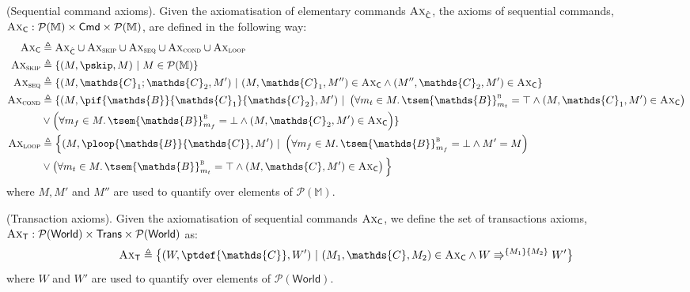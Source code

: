 \begin{defn}
	(Sequential command axioms).
	Given the axiomatisation of elementary commands $\textsc{Ax}_{\hat{\mathsf{C}}}$, the axioms of sequential commands, $\textsc{Ax}_\mathsf{C} : \mathcal{P}(\mathbb{M}) \times \mathsf{Cmd} \times \mathcal{P}(\mathbb{M})$, are defined in the following way:
	\begin{align*}
		\textsc{Ax}_\mathsf{C} &\triangleq \textsc{Ax}_{\hat{\mathsf{C}}} \cup \textsc{Ax}_{\textsc{skip}} \cup \textsc{Ax}_{\textsc{seq}} \cup \textsc{Ax}_{\textsc{cond}} \cup \textsc{Ax}_{\textsc{loop}}
		\\
		\textsc{Ax}_{\textsc{skip}} &\triangleq \{ (M, \pskip, M)\ |\ M \in \mathcal{P}(\mathbb{M}) \}
		\\
		\textsc{Ax}_{\textsc{seq}} &\triangleq \{ (M, \mathds{C}_1 ; \mathds{C}_2, M')\ |\ (M, \mathds{C}_1, M'') \in \textsc{Ax}_\mathsf{C} \land (M'', \mathds{C}_2, M') \in \textsc{Ax}_\mathsf{C} \}
		\\
		\textsc{Ax}_{\textsc{cond}} &\triangleq \{ (M, \pif{\mathds{B}}{\mathds{C}_1}{\mathds{C}_2}, M')\ |\ \left( \forall m_t \in M \ldotp \tsem{\mathds{B}}^\textsc{b}_{m_t} = \top \land (M, \mathds{C}_1, M') \in \textsc{Ax}_\mathsf{C} \right) \\ &\lor \left( \forall m_f \in M \ldotp \tsem{\mathds{B}}^\textsc{b}_{m_f} = \bot \land (M, \mathds{C}_2, M') \in \textsc{Ax}_\mathsf{C} \right) \}
		\\
		\textsc{Ax}_{\textsc{loop}} &\triangleq \Big\{ (M, \ploop{\mathds{B}}{\mathds{C}}, M')\ |\ \left( \forall m_f \in M \ldotp \tsem{\mathds{B}}^\textsc{b}_{m_f} = \bot \land M' = M \right) \\ &\lor \left( \forall m_t \in M \ldotp \tsem{\mathds{B}}^\textsc{b}_{m_t} = \top \land  (M, \mathds{C}, M') \in \textsc{Ax}_\mathsf{C} \right) \Big\}
	\end{align*}
	where $M, M'$ and $M''$ are used to quantify over elements of $\mathcal{P}(\mathbb{M})$.
\end{defn}

\begin{defn}
	(Transaction axioms).
	Given the axiomatisation of sequential commands $\textsc{Ax}_\mathsf{C}$, we define the set of transactions axioms, $\textsc{Ax}_\mathsf{T} : \mathcal{P}(\mathsf{World}) \times \mathsf{Trans} \times \mathcal{P}(\mathsf{World})$ as:
	\[
		\textsc{Ax}_\mathsf{T}
			\triangleq
		\big\{ (W, \ptdef{\mathds{C}}, W')\ |\ (M_1, \mathds{C}, M_2) \in \textsc{Ax}_\mathsf{C} \land W \Rrightarrow^{\{M_1\}\{M_2\}} W' \big\}
	\]
	where $W$ and $W'$ are used to quantify over elements of $\mathcal{P}(\mathsf{World})$.
\end{defn}

